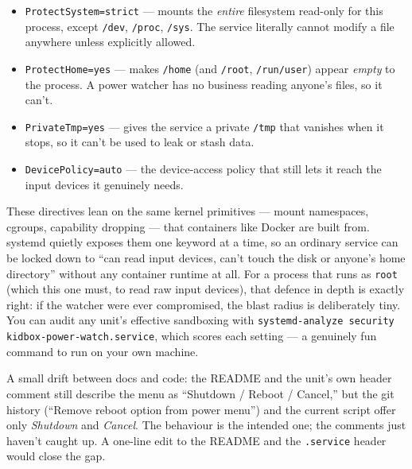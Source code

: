 \documentclass[11pt,oneside]{article}
\newcommand{\code}[1]{\texorpdfstring{\textcolor{kbblue}{\texttt{#1}}}{#1}}
\newcommand{\file}[1]{\textcolor{kbteal}{\texttt{#1}}}
\begin{document}
\begin{itemize}
\item \code{ProtectSystem=strict} --- mounts the \emph{entire} filesystem
read-only for this process, except \file{/dev}, \file{/proc}, \file{/sys}. The
service literally cannot modify a file anywhere unless explicitly allowed.
\item \code{ProtectHome=yes} --- makes \file{/home} (and \file{/root},
\file{/run/user}) appear \emph{empty} to the process. A power watcher has no
business reading anyone's files, so it can't.
\item \code{PrivateTmp=yes} --- gives the service a private \file{/tmp} that
vanishes when it stops, so it can't be used to leak or stash data.
\item \code{DevicePolicy=auto} --- the device-access policy that still lets it
reach the input devices it genuinely needs.
\end{itemize}

\begin{deeper}
These directives lean on the same kernel primitives --- mount namespaces,
cgroups, capability dropping --- that containers like Docker are built from.
systemd quietly exposes them one keyword at a time, so an ordinary service can be
locked down to ``can read input devices, can't touch the disk or anyone's home
directory'' without any container runtime at all. For a process that runs as
\texttt{root} (which this one must, to read raw input devices), that defence in
depth is exactly right: if the watcher were ever compromised, the blast radius is
deliberately tiny. You can audit any unit's effective sandboxing with
\texttt{systemd-analyze security kidbox-power-watch.service}, which scores each
setting --- a genuinely fun command to run on your own machine.
\end{deeper}

\begin{fieldnote}
A small drift between docs and code: the README and the unit's own header
comment still describe the menu as ``Shutdown / Reboot / Cancel,'' but the git
history (``Remove reboot option from power menu'') and the current script offer
only \emph{Shutdown} and \emph{Cancel}. The behaviour is the intended one; the
comments just haven't caught up. A one-line edit to the README and the
\file{.service} header would close the gap.
\end{fieldnote}

\end{document}
